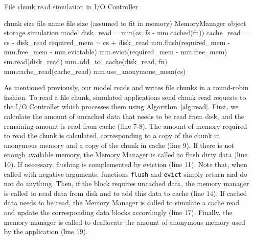 \documentclass[conference]{IEEEtran}
\newcommand{\Desc}[2]{\State \makebox[2em][l]{#1}#2}
\begin{document}
    \begin{algorithm}\caption{File chunk read simulation in I/O Controller}
    \label{alg:read}
        \small
        \begin{algorithmic}[1]
        \Input
            \Desc{cs}{chunk size}
            \Desc{fn}{file name}
            \Desc{fs}{file size (assumed to fit in memory)}
            \Desc{mm}{MemoryManager object}
            \Desc{sm}{storage simulation model}
           \EndInput
           \State disk\_read = min(cs, fs - mm.cached(fn)) 
           \State cache\_read = cs - disk\_read 
           \State required\_mem = cs + disk\_read
           \State mm.flush(required\_mem - mm.free\_mem - mm.evictable)
           \State mm.evict(required\_mem - mm.free\_mem)
             
           \State sm.read(disk\_read)
           \State mm.add\_to\_cache(disk\_read, fn)
           \EndIf
            
           \State mm.cache\_read(cache\_read)
        \EndIf
        \State mm.use\_anonymous\_mem(cs)
        \end{algorithmic}
    \end{algorithm}
    As mentioned previously, our model reads and writes file chunks in a
    round-robin fashion. To read a file chunk, simulated applications send
    chunk read requests to the I/O Controller which processes them using
    Algorithm~\ref{alg:read}. First, we calculate the amount of uncached
    data that needs to be read from disk, and the remaining amount is read
    from cache (line 7-8). The amount of memory required to read the chunk
    is calculated, corresponding to a copy of the chunk in anonymous memory
    and a copy of the chunk in cache (line 9).
    If there is not enough available memory, the Memory Manager is called
    to flush dirty data (line 10). If necessary, flushing is complemented by
    eviction (line 11). Note that, when called with negative arguments, functions
    \texttt{flush} and \texttt{evict} simply return and do not do anything. Then,
    if the block requires
    uncached data, the memory manager is called to read data from disk and to add this
    data to cache (line 14).
    If cached data needs to be read, the Memory Manager is called to simulate
    a cache read  and update the corresponding data blocks accordingly (line 17).
    Finally, the memory manager is called to deallocate the amount of anonymous memory used by the application (line 19).
\end{document}
